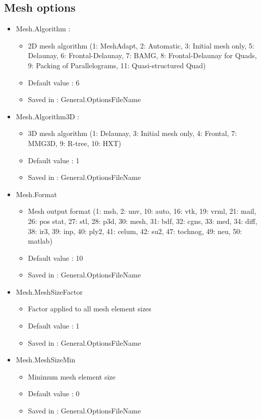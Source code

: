 \documentclass[dvipdfmx, 9pt, a4paper]{article}
\numberwithin{equation}{section}
\begin{document}
\subsection{Mesh options}
\begin{itemize}
\item Mesh.Algorithm :
\begin{itemize}
\item 2D mesh algorithm (1: MeshAdapt, 2: Automatic, 3: Initial mesh only, 5: Delaunay, 6: Frontal-Delaunay, 7: BAMG, 8: Frontal-Delaunay for Quads, 9: Packing of Parallelograms, 11: Quasi-structured Quad)
\item Default value : 6
\item Saved in : General.OptionsFileName
\end{itemize}
\item Mesh.Algorithm3D :
\begin{itemize}
\item 3D mesh algorithm (1: Delaunay, 3: Initial mesh only, 4: Frontal, 7: MMG3D, 9: R-tree, 10: HXT)
\item Default value : 1
\item Saved in : General.OptionsFileName
\end{itemize}
\item Mesh.Format
\begin{itemize}
\item Mesh output format (1: msh, 2: unv, 10: auto, 16: vtk, 19: vrml, 21: mail, 26: pos stat, 27: stl, 28: p3d, 30: mesh, 31: bdf, 32: cgns, 33: med, 34: diff, 38: ir3, 39: inp, 40: ply2, 41: celum, 42: su2, 47: tochnog, 49: neu, 50: matlab)
\item Default value : 10
\item Saved in : General.OptionsFileName
\end{itemize}
\item Mesh.MeshSizeFactor
\begin{itemize}
\item Factor applied to all mesh element sizes
\item Default value : 1
\item Saved in : General.OptionsFileName
\end{itemize}
\item Mesh.MeshSizeMin
\begin{itemize}
\item Minimum mesh element size
\item Default value : 0
\item Saved in : General.OptionsFileName

\end{itemize}
\end{itemize}
\end{document}
